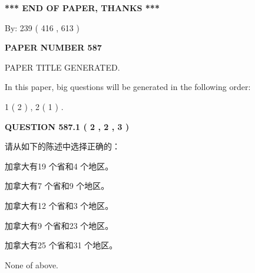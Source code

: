 \documentclass{ctexart}
\begin{document}
   
   
   
\vspace{1.0in} 
{\textbf{\large{ *** END OF PAPER, THANKS *** }}} 
   
   
\hspace{1.0in} By: 
 239 ( 416 ,  613 )
   
   
   
   
\newpage 
\setcounter{page}{ 
   587001 } 
   
   
   
   
 {\textbf{ \Large{ PAPER NUMBER  587  }}}
   
   
\vspace{0.2in}
   
   
   
   
   
   
   
   
 \vspace{0.2in}
 
 
 
 
   
   
 PAPER TITLE GENERATED.
   
   
   
\vspace{0.2in}
   
In this paper, big questions will be generated in the following order: 
   
   
   1 ( 2 )
 ,
   2 ( 1 )
 .
  
\vspace{0.2in}
  
{\textbf{\Large{QUESTION
587.1 
 ( 2 , 2 , 3 )
}}}
  
  
请从如下的陈述中选择正确的：
 
 
加拿大有19 个省和4 个地区。
 
 
加拿大有7 个省和9 个地区。
 
 
加拿大有12 个省和3 个地区。
 
 
加拿大有9 个省和23 个地区。
 
 
加拿大有25 个省和31 个地区。
 
 
 None of above.
 
 
\noindent{}
 
\end{document}
